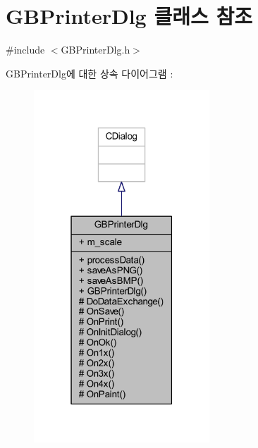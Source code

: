 \hypertarget{class_g_b_printer_dlg}{}\section{G\+B\+Printer\+Dlg 클래스 참조}
\label{class_g_b_printer_dlg}


{\ttfamily \#include $<$G\+B\+Printer\+Dlg.\+h$>$}



G\+B\+Printer\+Dlg에 대한 상속 다이어그램 \+: \nopagebreak
\begin{figure}[H]
\begin{center}
\leavevmode
\includegraphics[width=187pt]{class_g_b_printer_dlg__inherit__graph}
\end{center}
\end{figure}


